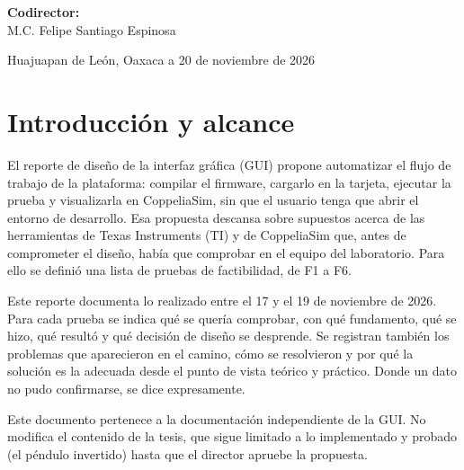 \documentclass[12pt,letterpaper]{article}
\begin{document}
\begin{center}
    {\textbf{Codirector:}\\\vspace{0.2cm}
   M.C. Felipe Santiago Espinosa\vspace{0.2cm}\\}
\end{center}

\begin{center}
    \vspace{0.4cm}
	{Huajuapan de León, Oaxaca a 20 de noviembre de 2026}
\end{center}
\clearpage

\tableofcontents\clearpage

\section{Introducción y alcance}
\label{sec:intro}

El reporte de diseño de la interfaz gráfica (GUI) propone automatizar el flujo de trabajo de la plataforma: compilar el firmware, cargarlo en la tarjeta, ejecutar la prueba y visualizarla en CoppeliaSim, sin que el usuario tenga que abrir el entorno de desarrollo. Esa propuesta descansa sobre supuestos acerca de las herramientas de Texas Instruments (TI) y de CoppeliaSim que, antes de comprometer el diseño, había que comprobar en el equipo del laboratorio. Para ello se definió una lista de pruebas de factibilidad, de F1 a F6.

Este reporte documenta lo realizado entre el 17 y el 19 de noviembre de 2026. Para cada prueba se indica qué se quería comprobar, con qué fundamento, qué se hizo, qué resultó y qué decisión de diseño se desprende. Se registran también los problemas que aparecieron en el camino, cómo se resolvieron y por qué la solución es la adecuada desde el punto de vista teórico y práctico. Donde un dato no pudo confirmarse, se dice expresamente.

Este documento pertenece a la documentación independiente de la GUI. No modifica el contenido de la tesis, que sigue limitado a lo implementado y probado (el péndulo invertido) hasta que el director apruebe la propuesta.
\end{document}
